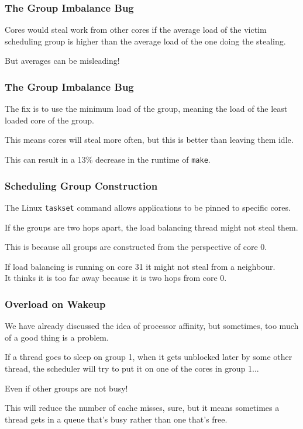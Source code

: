 \begin{frame}
\frametitle{The Group Imbalance Bug}

Cores would steal work from other cores if the average load of the victim scheduling group is higher than the average load of the one doing the stealing. 

But averages can be misleading! 

\end{frame}



\begin{frame}
\frametitle{The Group Imbalance Bug}

The fix is to use the minimum load of the group, meaning the load of the least loaded core of the group. 

This means cores will steal more often, but this is better than leaving them idle. 

This can result in a 13\% decrease in the runtime of \texttt{make}.

\end{frame}



\begin{frame}
\frametitle{Scheduling Group Construction}

The Linux \texttt{taskset} command allows applications to be pinned to specific cores. 

If the groups are two hops apart, the load balancing thread might not steal them. 

This is because all groups are constructed from the perspective of core 0. 

If load balancing is running on core 31 it might not steal from a neighbour.\\
\quad It thinks it is too far away because it is two hops from core 0.

\end{frame}



\begin{frame}
\frametitle{Overload on Wakeup}

We have already discussed the idea of processor affinity, but sometimes, too much of a good thing is a problem. 

If a thread goes to sleep on group 1, when it gets unblocked later by some other thread, the scheduler will try to put it on one of the cores in group 1... 

Even if other groups are not busy! 

This will reduce the number of cache misses, sure, but it means sometimes a thread gets in a queue that's busy rather than one that's free.

\end{frame}





